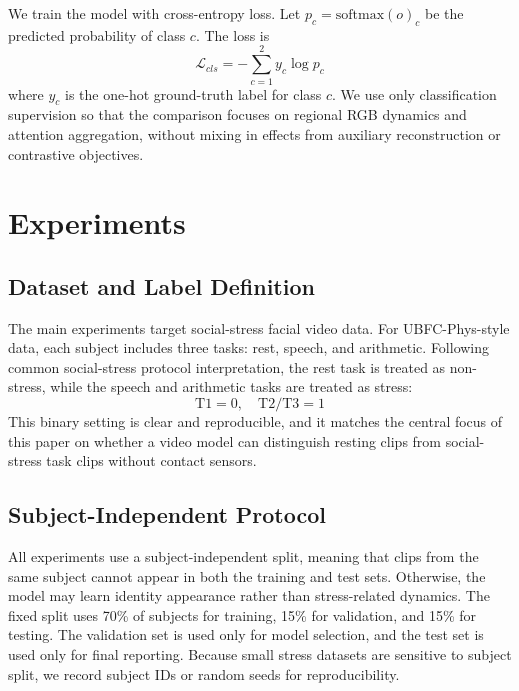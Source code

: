 \documentclass[runningheads]{llncs}
\begin{document}
We train the model with cross-entropy loss. Let $p_c=\mathrm{softmax}(o)_c$ be the predicted probability of class $c$. The loss is
\begin{equation}
    \mathcal{L}_{cls} = -\sum_{c=1}^{2} y_c \log p_c
\end{equation}
where $y_c$ is the one-hot ground-truth label for class $c$. We use only classification supervision so that the comparison focuses on regional RGB dynamics and attention aggregation, without mixing in effects from auxiliary reconstruction or contrastive objectives.

\section{Experiments}

\subsection{Dataset and Label Definition}

The main experiments target social-stress facial video data. For UBFC-Phys-style data, each subject includes three tasks: rest, speech, and arithmetic. Following common social-stress protocol interpretation, the rest task is treated as non-stress, while the speech and arithmetic tasks are treated as stress:
\begin{equation}
    \mathrm{T1}=0,\quad \mathrm{T2/T3}=1
\end{equation}
This binary setting is clear and reproducible, and it matches the central focus of this paper on whether a video model can distinguish resting clips from social-stress task clips without contact sensors.


\subsection{Subject-Independent Protocol}

All experiments use a subject-independent split, meaning that clips from the same subject cannot appear in both the training and test sets. Otherwise, the model may learn identity appearance rather than stress-related dynamics. The fixed split uses 70\% of subjects for training, 15\% for validation, and 15\% for testing. The validation set is used only for model selection, and the test set is used only for final reporting. Because small stress datasets are sensitive to subject split, we record subject IDs or random seeds for reproducibility.
\end{document}
